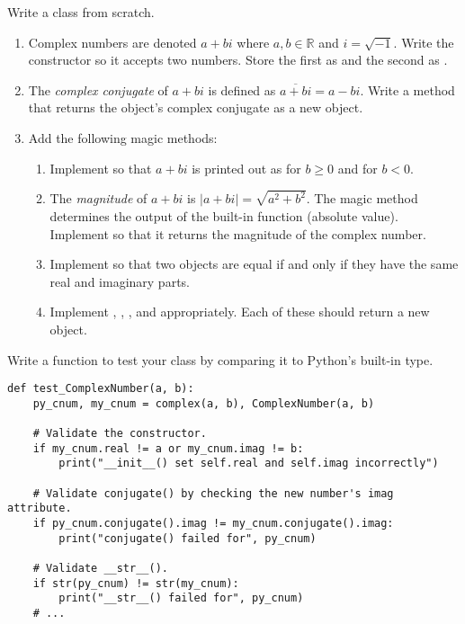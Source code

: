 \begin{problem} %
Write a  class from scratch.
\begin{enumerate}
\item Complex numbers are denoted $a+bi$ where $a,b\in\mathbb{R}$ and $i=\sqrt{-1}$.
Write the constructor so it accepts two numbers.
Store the first as  and the second as .
\item The \emph{complex conjugate} of $a+bi$ is defined as $\overline{a+bi} = a - bi$.
Write a  method that returns the object's complex conjugate as a new  object.
\item Add the following magic methods:
\begin{enumerate}
\item Implement  so that $a+bi$ is printed out as  for $b \ge 0$ and  for $b < 0$.
\item The \emph{magnitude} of $a+bi$ is $|a+bi| = \sqrt{a^2+b^2}$.
The  magic method determines the output of the built-in  function (absolute value).
Implement  so that it returns the magnitude of the complex number.
\item Implement  so that two  objects are equal if and only if they have the same real and imaginary parts.
\item Implement , , , and  appropriately.
Each of these should return a new  object.
\end{enumerate}
\end{enumerate}
Write a function to test your class by comparing it to Python's built-in  type.
\begin{lstlisting}
def test_ComplexNumber(a, b):
    py_cnum, my_cnum = complex(a, b), ComplexNumber(a, b)

    # Validate the constructor.
    if my_cnum.real != a or my_cnum.imag != b:
        print("__init__() set self.real and self.imag incorrectly")

    # Validate conjugate() by checking the new number's imag attribute.
    if py_cnum.conjugate().imag != my_cnum.conjugate().imag:
        print("conjugate() failed for", py_cnum)

    # Validate __str__().
    if str(py_cnum) != str(my_cnum):
        print("__str__() failed for", py_cnum)
    # ...
\end{lstlisting}
\end{problem}

